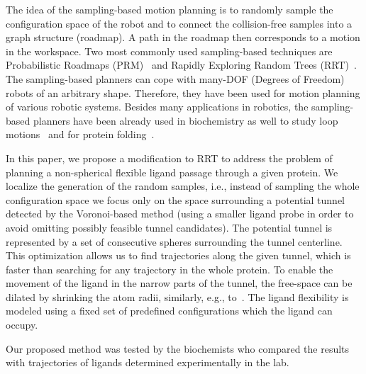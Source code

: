 \documentclass[usletter, 10pt, conference]{ieeeconf} %
\begin{document}
The idea of the sampling-based motion planning is to randomly sample the configuration space of the robot and to connect the collision-free samples
into a graph structure (roadmap).
A path in the roadmap then corresponds to a motion in the workspace.
Two most commonly used sampling-based techniques are Probabilistic Roadmaps (PRM)~\cite{kavrakiForPP} and Rapidly Exploring Random Trees (RRT)~\cite{lavalleRRT}.
The sampling-based planners can cope with many-DOF (Degrees of Freedom) robots of an arbitrary shape.
Therefore, they have been used for motion planning of various robotic systems.
Besides many applications in robotics, the sampling-based planners have been already used in biochemistry as well 
to study loop motions~\cite{cortes2004geometric}
and for protein folding~\cite{raveh2009rapid,novinskaya2015improving}.

In this paper, we propose a modification to RRT to address the problem of planning a non-spherical flexible ligand passage through a given protein.
We localize the generation of the random samples, i.e., instead of sampling the whole configuration space we focus only on the space surrounding a potential tunnel detected by the Voronoi-based method (using a smaller ligand probe in order to avoid omitting possibly feasible tunnel candidates).
The potential tunnel is represented by a set of consecutive spheres surrounding the tunnel centerline.
This optimization allows us to find trajectories along the given tunnel, which is faster than searching for any trajectory in the whole protein.
To enable the movement of the ligand in the narrow parts of the tunnel, the free-space can be dilated by shrinking the atom radii, similarly, e.g., to~\cite{cortes2005path,hsu06multilevel}. 
The ligand flexibility is modeled using a fixed set of predefined configurations which the ligand can occupy.

Our proposed method was tested by the biochemists who compared the results with trajectories of ligands determined experimentally in the lab.
\end{document}
